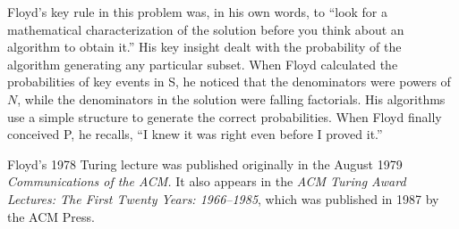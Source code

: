 Floyd's key rule in this problem was, in his own words, to ``look for a
mathematical characterization of the solution before you think about an
algorithm to obtain it.'' His key insight dealt with the probability of the
algorithm generating any particular subset. When Floyd calculated the
probabilities of key events in \alg S, he noticed that the denominators were
powers of $N$, while the denominators in the solution were falling factorials.
His algorithms use a simple structure to generate the correct probabilities.
When Floyd finally conceived \alg P, he recalls, ``I knew it was right even
before I proved it.''

Floyd's 1978 Turing lecture was published originally in the August 1979
{\sl Communications of the ACM\/.} It also appears in the {\sl ACM Turing Award
Lectures: The First Twenty Years: 1966--1985\/}, which was published in 1987 by
the ACM Press.
 
\bye
